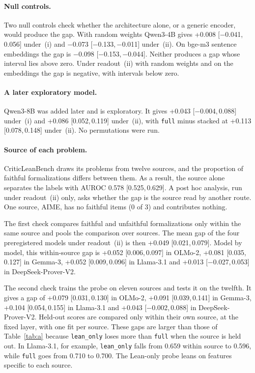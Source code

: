 \documentclass[10pt]{article}
\newcommand{\vr}[1]{\texttt{#1}}
\newcommand{\ic}[2]{[#1,\,#2]}
\begin{document}
\paragraph{Null controls.}
Two null controls check whether the architecture alone, or a generic encoder, would produce the gap.
With random weights Qwen3-4B gives +0.008 \ic{−0.041}{0.056} under~(i) and −0.073 \ic{−0.133}{−0.011} under~(ii).
On bge-m3 sentence embeddings \citep{bgem3} the gap is −0.098 \ic{−0.153}{−0.044}. Neither produces a gap whose interval lies above zero. Under readout~(ii) with random weights and on the embeddings the gap is
negative, with intervals below zero.

\paragraph{A later exploratory model.}
Qwen3-8B was added later and is exploratory. It gives +0.043 \ic{−0.004}{0.088} under~(i) and +0.086
\ic{0.052}{0.119} under~(ii), with \vr{full} minus stacked at +0.113 \ic{0.078}{0.148} under~(ii). No permutations
were run.

\paragraph{Source of each problem.}
CriticLeanBench draws its problems from twelve sources, and the proportion of faithful formalizations differs
between them. As a result, the source alone separates the labels with AUROC 0.578 \ic{0.525}{0.629}. A post hoc
analysis, run under readout~(ii) only, asks whether the gap is the source read by another route. One source, AIME,
has no faithful items (0 of 3) and contributes nothing.

The first check compares faithful and unfaithful formalizations only within the same source and pools the
comparison over sources. The mean gap of the four preregistered models under readout~(ii) is then +0.049
\ic{0.021}{0.079}. Model by model, this within-source gap is +0.052 \ic{0.006}{0.097} in OLMo-2, +0.081
\ic{0.035}{0.127} in Gemma-3, +0.052 \ic{0.009}{0.096} in Llama-3.1 and +0.013 \ic{−0.027}{0.053} in
DeepSeek-Prover-V2.

The second check trains the probe on eleven sources and tests it on the twelfth. It gives a gap of +0.079
\ic{0.031}{0.130} in OLMo-2, +0.091 \ic{0.039}{0.141} in Gemma-3, +0.104 \ic{0.054}{0.155} in Llama-3.1 and +0.043
\ic{−0.002}{0.088} in DeepSeek-Prover-V2. Held-out scores are compared only within their own source, at the fixed
layer, with one fit per source. These gaps are larger than those of Table~\ref{tab:a} because \vr{lean\_only} loses
more than \vr{full} when the source is held out. In Llama-3.1, for example, \vr{lean\_only} falls from 0.659 within
source to 0.596, while \vr{full} goes from 0.710 to 0.700. The Lean-only probe leans on features specific to each
source.
\end{document}
